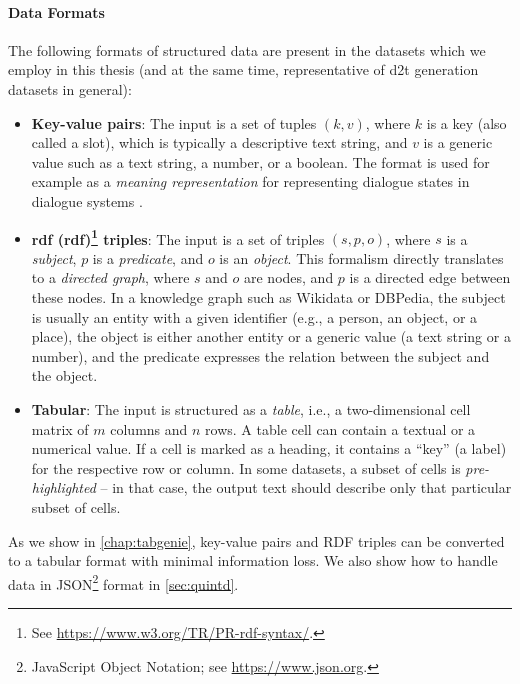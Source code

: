 {\paragraph{Data Formats} The following formats of structured data are present in the datasets which we employ in this thesis (and at the same time, representative of \ac{d2t} generation datasets in general):

\begin{itemize}
    \item \textbf{Key-value pairs}: The input is a set of tuples $(k, v)$, where $k$ is a key (also called a slot), which is typically a descriptive text string, and $v$ is a generic value such as a text string, a number, or a boolean. The format is used for example as a \emph{meaning representation} for representing dialogue states in dialogue systems \cite{rastogiScalableMultiDomainConversational2020,budzianowskiMultiWOZLargeScaleMultiDomain2020}.
    \item \textbf{\acs{rdf} (\Acl{rdf})\footnote{See \url{https://www.w3.org/TR/PR-rdf-syntax/}.} triples}: The input is a set of triples $(s, p, o)$, where $s$ is a \emph{subject},  $p$ is a \emph{predicate}, and $o$ is an \textit{object}. This formalism directly translates to a \emph{directed graph}, where $s$ and $o$ are nodes, and $p$ is a directed edge between these nodes. In a knowledge graph such as Wikidata or DBPedia, the subject is usually an entity with a given identifier (e.g., a person, an object, or a place), the object is either another entity or a generic value (a text string or a number), and the predicate expresses the relation between the subject and the object.
    \item \textbf{Tabular}: The input is structured as a \textit{table}, i.e., a two-dimensional cell matrix of $m$ columns and $n$ rows. A table cell can contain a textual or a numerical value. If a cell is marked as a heading, it contains a ``key'' (a label) for the respective row or column. In some datasets, a subset of cells is \emph{pre-highlighted} -- in that case, the output text should describe only that particular subset of cells.
\end{itemize}



As we show in \autoref{chap:tabgenie}, key-value pairs and RDF triples can be converted to a tabular format with minimal information loss. We also show how to handle data in JSON\footnote{JavaScript Object Notation; see \url{https://www.json.org}.} format in \autoref{sec:quintd}.

}
